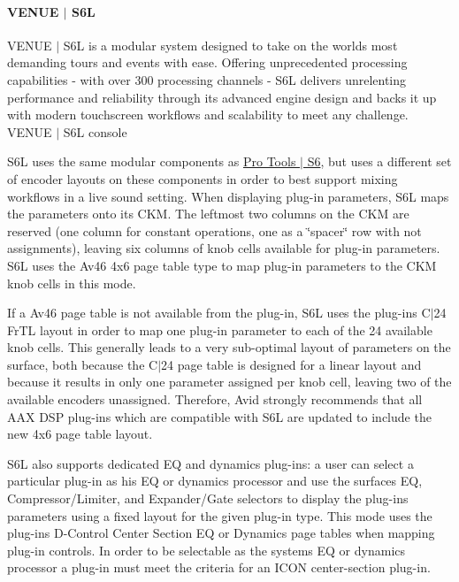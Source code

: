 \hypertarget{a00363_subsubsection__venue_s6l}{}\paragraph{V\+E\+N\+U\+E $\vert$ S6\+L}\label{a00363_subsubsection__venue_s6l}
V\+E\+N\+U\+E $\vert$ S6\+L is a modular system designed to take on the world\textquotesingle{}s most demanding tours and events with ease. Offering unprecedented processing capabilities -\/ with over 300 processing channels -\/ S6\+L delivers unrelenting performance and reliability through its advanced engine design and backs it up with modern touchscreen workflows and scalability to meet any challenge.   V\+E\+N\+U\+E $\vert$ S6\+L console 

S6\+L uses the same modular components as \hyperlink{a00363_subsubsection__avid_s6}{Pro Tools $\vert$ S6}, but uses a different set of encoder layouts on these components in order to best support mixing workflows in a live sound setting. When displaying plug-\/in parameters, S6\+L maps the parameters onto its C\+K\+M. The leftmost two columns on the C\+K\+M are reserved (one column for constant operations, one as a \char`\"{}spacer\char`\"{} row with not assignments), leaving six columns of knob cells available for plug-\/in parameters. S6\+L uses the {\ttfamily \textquotesingle{}Av46\textquotesingle{}} 4x6 page table type to map plug-\/in parameters to the C\+K\+M knob cells in this mode.

If a {\ttfamily \textquotesingle{}Av46\textquotesingle{}} page table is not available from the plug-\/in, S6\+L uses the plug-\/in\textquotesingle{}s C$\vert$24 {\ttfamily \textquotesingle{}Fr\+T\+L\textquotesingle{}} layout in order to map one plug-\/in parameter to each of the 24 available knob cells. This generally leads to a very sub-\/optimal layout of parameters on the surface, both because the C$\vert$24 page table is designed for a linear layout and because it results in only one parameter assigned per knob cell, leaving two of the available encoders unassigned. Therefore, Avid strongly recommends that all A\+A\+X D\+S\+P plug-\/ins which are compatible with S6\+L are updated to include the new 4x6 page table layout.

S6\+L also supports dedicated E\+Q and dynamics plug-\/ins\+: a user can select a particular plug-\/in as his E\+Q or dynamics processor and use the surface\textquotesingle{}s E\+Q, Compressor/\+Limiter, and Expander/\+Gate selectors to display the plug-\/in\textquotesingle{}s parameters using a fixed layout for the given plug-\/in type. This mode uses the plug-\/in\textquotesingle{}s D-\/\+Control Center Section E\+Q or Dynamics page tables when mapping plug-\/in controls. In order to be selectable as the system\textquotesingle{}s E\+Q or dynamics processor a plug-\/in must meet the criteria for an I\+C\+O\+N center-\/section plug-\/in.

